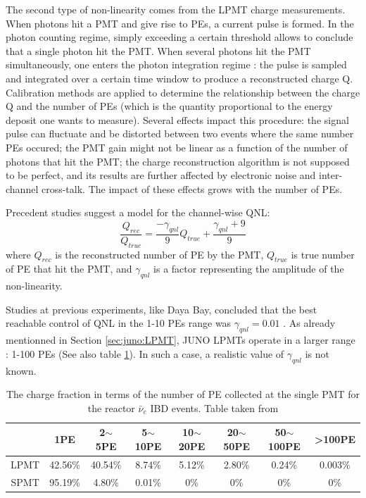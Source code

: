 \documentclass[../main.tex]{subfiles}
\begin{document}
The second type of non-linearity comes from the LPMT charge measurements. When photons hit a PMT and give rise to PEs, a current pulse is formed. In the photon counting regime, simply exceeding a certain threshold allows to conclude that a single photon hit the PMT. When several photons hit the PMT simultaneously, one enters the photon integration regime : the pulse is sampled and integrated over a certain time window to produce a reconstructed charge Q. Calibration methods are applied to determine the relationship between the charge Q and the number of PEs (which is the quantity proportional to the energy deposit one wants to measure). Several effects impact this procedure: the signal pulse can fluctuate and be distorted between two events where the same number PEs occured; the PMT gain might not be linear as a function of the number of photons that hit the PMT; the charge reconstruction algorithm is not supposed to be perfect, and its results are further affected by electronic noise and inter-channel cross-talk. The impact of these effects grows with the number of PEs.

Precedent studies \cite{han_dual_2021} suggest a model for the channel-wise QNL:
\begin{equation}
  \label{eq:joint_fit:gamma_yang}
  \frac{Q_{rec}}{Q_{true}} = \frac{-\gamma_{qnl}}{9} Q_{true} + \frac{\gamma_{qnl} + 9}{9}
\end{equation}
where $Q_{rec}$ is the reconstructed number of PE by the PMT, $Q_{true}$ is true number of PE that hit the PMT, and $\gamma_{qnl}$ is a factor representing the amplitude of the non-linearity.

Studies at previous experiments, like Daya Bay, concluded that the best reachable control of QNL in the 1-10 PEs range was $\gamma_{qnl}=0.01$ \cite{collaboration_high_2019}.
As already mentionned in Section \ref{sec:juno:LPMT}, JUNO LPMTs operate in a larger range : 1-100 PEs (See also table \ref{tab:joint_fit:charge_frac}). In such a case, a realistic value of $\gamma_{qnl}$ is not known.

\begin{table}[ht]
  \centering
  \begin{tabular}{c|c|c|c|c|c|c|c}
        &1PE &2$\sim$5PE& 5$\sim$10PE & 10$\sim$20PE & 20$\sim$50PE & 50$\sim$100PE & >100PE \\
      \hline
    LPMT &42.56\% & 40.54\% & 8.74\% & 5.12\% & 2.80\% & 0.24\% & 0.003\% \\
    SPMT &95.19\% & 4.80\%  & 0.01\% & 0\%    & 0\%    & 0\%    & 0\% \\
    \hline
  \end{tabular}
  \caption{The charge fraction in terms of the number of PE collected at the single PMT for the reactor $\bar{\nu}_e$ IBD events. Table taken from \cite{han_dual_2021}}
  \label{tab:joint_fit:charge_frac}
\end{table}
\end{document}
